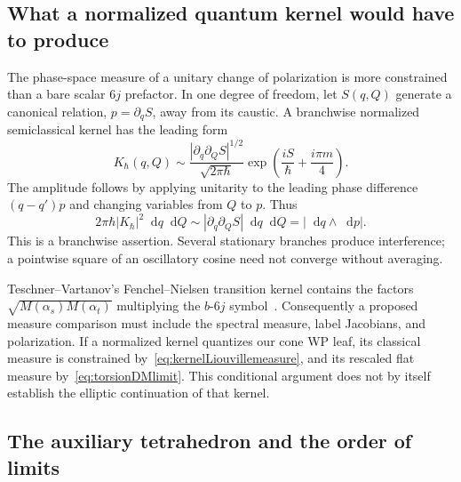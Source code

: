 \documentclass[11pt,a4paper]{article}
\numberwithin{equation}{section}
\theoremstyle{definition}
\theoremstyle{remark}
\newcommand{\dd}{\mathop{}\!\mathrm d}
\begin{document}
\subsection{What a normalized quantum kernel would have to produce}

The phase-space measure of a unitary change of polarization is
more constrained than a bare scalar $6j$ prefactor. In one
degree of freedom, let $S(q,Q)$ generate a canonical relation,
$p=\partial_qS$, away from its caustic. A branchwise normalized
semiclassical kernel has the leading form
\begin{equation}
 K_\hbar(q,Q)\sim
  \frac{|\partial_q\partial_QS|^{1/2}}{\sqrt{2\pi\hbar}}
       \exp\left(\frac{iS}{\hbar}+\frac{i\pi m}{4}\right).
 \label{eq:normalizedWKBkernel}
\end{equation}
The amplitude follows by applying unitarity to the leading
phase difference $(q-q')p$ and changing variables from $Q$ to
$p$. Thus
\begin{equation}
 2\pi\hbar|K_\hbar|^2\dd q\dd Q
     \sim |\partial_q\partial_QS|\dd q\dd Q
     =|\dd q\wedge\dd p|.
 \label{eq:kernelLiouvillemeasure}
\end{equation}
This is a branchwise assertion. Several stationary branches
produce interference; a pointwise square of an oscillatory
cosine need not converge without averaging.

Teschner--Vartanov's Fenchel--Nielsen transition kernel contains
the factors $\sqrt{M(\alpha_s)M(\alpha_t)}$ multiplying the
$b$-$6j$ symbol~\cite[eq.~(5.14)]{TeschnerVartanov}.
Consequently a proposed measure comparison must include the
spectral measure, label Jacobians, and polarization. If a
normalized kernel quantizes our cone WP leaf, its classical
measure is constrained by~\eqref{eq:kernelLiouvillemeasure},
and its rescaled flat measure by~\eqref{eq:torsionDMlimit}.
This conditional argument does not by itself establish the
elliptic continuation of that kernel.

\subsection{The auxiliary tetrahedron and the order of limits}
\end{document}
